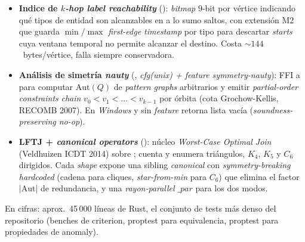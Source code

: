 \begin{itemize}
    (): inspecciona la hipótesis y elige
    entre el DFS general y \emph{fast-paths} estructurales. Hoy
    detecta \(K_4\) homogéneo (\emph{6 pasos}, \emph{tipo de
    entidad y relación constantes}, \emph{sin predicados}) y
    rutea a ; el
    \emph{enum}  está diseñado para crecer a
    \(K_5\), \(C_6\) y \emph{shapes} más complejas sin tocar
    \emph{call-sites}. La detección estructural complementa al
    detector legacy por \emph{name marker} de S3.
    \item \textbf{Indice de \emph{$k$-hop label reachability}}
    (): \emph{bitmap} \(9\)-bit por
    vértice indicando qué tipos de entidad son alcanzables en a lo
    sumo  saltos, con extensión M2 que guarda
    \(\min/\max\) \emph{first-edge timestamp} por tipo para
    descartar \emph{starts} cuya ventana temporal no permite
    alcanzar el destino. Costa $\sim 144$~bytes/vértice, falla
    siempre conservadora.
    \item \textbf{Análisis de simetría \emph{nauty}}
    (, \emph{cfg(unix) +
    feature symmetry-nauty}): FFI a  para
    computar \(\mathrm{Aut}(Q)\) de \emph{pattern graphs}
    arbitrarios y emitir \emph{partial-order constraints}
    \emph{chain} \(v_0 < v_1 < \ldots < v_{k-1}\) por órbita
    (cota Grochow-Kellis, RECOMB 2007). En \emph{Windows} y sin
    \emph{feature} retorna lista vacía
    (\emph{soundness-preserving no-op}).
    \item \textbf{LFTJ + \emph{canonical operators}}
    (): núcleo \emph{Worst-Case Optimal
    Join} (Veldhuizen ICDT 2014) sobre ;
    cuenta y enumera triángulos, \(K_4\), \(K_5\) y \(C_6\)
    dirigidos. Cada \emph{shape} expone una sibling
    \emph{canonical} con \emph{symmetry-breaking} \emph{hardcoded}
    (cadena para cliques, \emph{star-from-min} para \(C_6\)) que
    elimina el factor \(|\mathrm{Aut}|\) de redundancia, y una
    \emph{rayon-parallel} \(\_par\) para los dos modos.
\end{itemize}

En cifras: aprox.\ 45\,000 líneas de Rust, el conjunto de tests más
denso del repositorio (benches de criterion, proptest para
equivalencia, proptest para propiedades de anomaly).

\section{}

